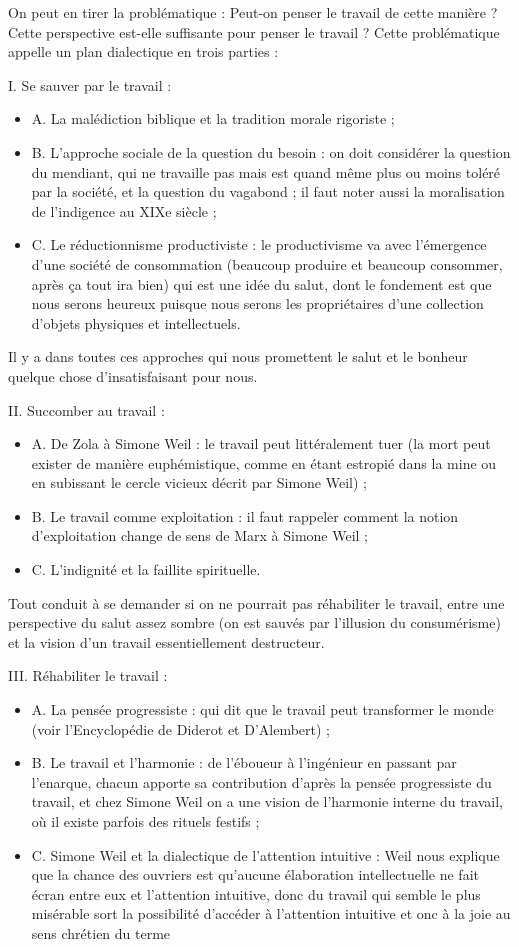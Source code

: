 \documentclass[a4paper,12pt]{book}
\begin{document}
\par On peut en tirer la problématique : Peut-on penser le travail de cette manière ? Cette perspective est-elle suffisante pour penser le travail ? Cette problématique appelle un plan dialectique en trois parties :
\par I. Se sauver par le travail :\begin{itemize}
\item A. La malédiction biblique et la tradition morale rigoriste ;
\item B. L'approche sociale de la question du besoin : on doit considérer la question du mendiant, qui ne travaille pas mais est quand même plus ou moins toléré par la société, et la question du vagabond ; il faut noter aussi la moralisation de l'indigence au XIXe siècle ;
\item C. Le réductionnisme productiviste : le productivisme va avec l'émergence d'une société de consommation (beaucoup produire et beaucoup consommer, après ça tout ira bien) qui est une idée du salut, dont le fondement est que nous serons heureux puisque nous serons les propriétaires d'une collection d'objets physiques et intellectuels.
\end{itemize}
Il y a dans toutes ces approches qui nous promettent le salut et le bonheur quelque chose d'insatisfaisant pour nous.
\par II. Succomber au travail :\begin{itemize}
\item A. De Zola à Simone Weil : le travail peut littéralement tuer (la mort peut exister de manière euphémistique, comme en étant estropié dans la mine ou en subissant le cercle vicieux décrit par Simone Weil) ;
\item B. Le travail comme exploitation : il faut rappeler comment la notion d'exploitation change de sens de Marx à Simone Weil ;
\item C. L'indignité et la faillite spirituelle.
\end{itemize}
Tout conduit à se demander si on ne pourrait pas réhabiliter le travail, entre une perspective du salut assez sombre (on est sauvés par l'illusion du consumérisme) et la vision d'un travail essentiellement destructeur.
\par III. Réhabiliter le travail :\begin{itemize}
\item A. La pensée progressiste : qui dit que le travail peut transformer le monde (voir l'Encyclopédie de Diderot et D'Alembert) ;
\item B. Le travail et l'harmonie : de l'éboueur à l'ingénieur en passant par l'enarque, chacun apporte sa contribution d'après la pensée progressiste du travail, et chez Simone Weil on a une vision de l'harmonie interne du travail, où il existe parfois des rituels festifs ;
\item C. Simone Weil et la dialectique de l'attention intuitive : Weil nous explique que la chance des ouvriers est qu'aucune élaboration intellectuelle ne fait écran entre eux et l'attention intuitive, donc du travail qui semble le plus misérable sort la possibilité d'accéder à l'attention intuitive et onc à la joie au sens chrétien du terme
\end{itemize}
\end{document}
